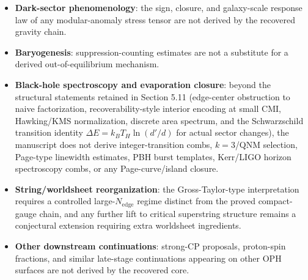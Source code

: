 \begin{itemize}
\item \textbf{Dark-sector phenomenology}: the sign, closure, and galaxy-scale response law of any modular-anomaly stress tensor are not derived by the recovered gravity chain.
\item \textbf{Baryogenesis}: suppression-counting estimates are not a substitute for a derived out-of-equilibrium mechanism.
\item \textbf{Black-hole spectroscopy and evaporation closure}: beyond the structural statements retained in Section 5.11 (edge-center obstruction to naive factorization, recoverability-style interior encoding at small CMI, Hawking/KMS normalization, discrete area spectrum, and the Schwarzschild transition identity \(\Delta E = k_B T_H \ln(d'/d)\) for actual sector changes), the manuscript does not derive integer-transition combs, \(k=3\)/QNM selection, Page-type linewidth estimates, PBH burst templates, Kerr/LIGO horizon spectroscopy combs, or any Page-curve/island closure.
\item \textbf{String/worldsheet reorganization}: the Gross-Taylor-type interpretation~\cite{grossTaylor93} requires a controlled large-\(N_{\mathrm{edge}}\) regime distinct from the proved compact-gauge chain, and any further lift to critical superstring structure remains a conjectural extension requiring extra worldsheet ingredients.
\item \textbf{Other downstream continuations}: strong-CP proposals, proton-spin fractions, and similar late-stage continuations appearing on other OPH surfaces are not derived by the recovered core.
\end{itemize}

